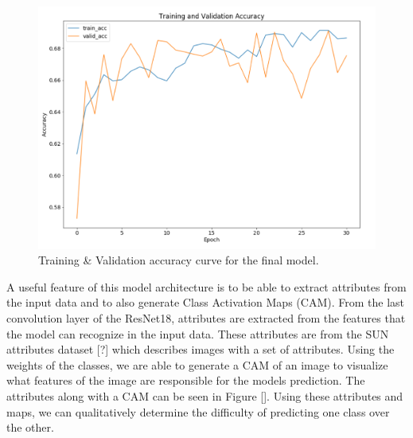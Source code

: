 \documentclass[10pt,twocolumn,letterpaper]{article}
\begin{document}
\begin{figure}[t]
\begin{center}
	\includegraphics[width=1\linewidth]{final_acc_curve.png}
\end{center}
   \caption{Training \& Validation accuracy curve for the final model.}
\label{fig:long}
\label{fig:onecol}
\end{figure}


A useful feature of this model architecture is  to be able to extract attributes from the input data and to also generate Class Activation Maps (CAM). From the last convolution layer of the ResNet18, attributes are extracted from the features that the model can recognize in the input data. These attributes are from the SUN attributes dataset [?] which describes images with a set of attributes.  Using the weights of the classes, we are able to generate a CAM of an image to visualize what features of the image are responsible for the models prediction. The attributes along with a CAM can be seen in Figure []. Using these attributes and maps, we can qualitatively determine the difficulty of predicting one class over the other.
\end{document}
